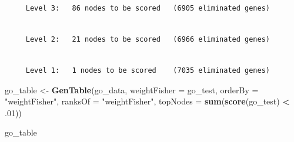 \documentclass[]{article}
\newenvironment{Shaded}{\begin{snugshade}}{\end{snugshade}}
\newcommand{\KeywordTok}[1]{\textcolor[rgb]{0.13,0.29,0.53}{\textbf{#1}}}
\newcommand{\DataTypeTok}[1]{\textcolor[rgb]{0.13,0.29,0.53}{#1}}
\newcommand{\DecValTok}[1]{\textcolor[rgb]{0.00,0.00,0.81}{#1}}
\newcommand{\StringTok}[1]{\textcolor[rgb]{0.31,0.60,0.02}{#1}}
\newcommand{\OperatorTok}[1]{\textcolor[rgb]{0.81,0.36,0.00}{\textbf{#1}}}
\newcommand{\NormalTok}[1]{#1}
\begin{document}
\begin{verbatim}

     Level 3:   86 nodes to be scored   (6905 eliminated genes)
\end{verbatim}

\begin{verbatim}

     Level 2:   21 nodes to be scored   (6966 eliminated genes)
\end{verbatim}

\begin{verbatim}

     Level 1:   1 nodes to be scored    (7035 eliminated genes)
\end{verbatim}

\begin{Shaded}
\begin{Highlighting}[]
\NormalTok{go_table <-}\StringTok{ }\KeywordTok{GenTable}\NormalTok{(go_data, }\DataTypeTok{weightFisher =}\NormalTok{ go_test,}
                         \DataTypeTok{orderBy =} \StringTok{"weightFisher"}\NormalTok{, }\DataTypeTok{ranksOf =} \StringTok{"weightFisher"}\NormalTok{,}
                         \DataTypeTok{topNodes =} \KeywordTok{sum}\NormalTok{(}\KeywordTok{score}\NormalTok{(go_test) }\OperatorTok{<}\StringTok{ }\NormalTok{.}\DecValTok{01}\NormalTok{))}

\NormalTok{go_table}
\end{Highlighting}
\end{Shaded}
\end{document}
